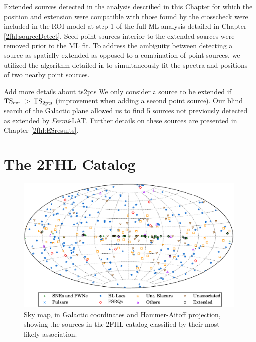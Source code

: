 Extended sources detected in the analysis described in this Chapter for which the position and extension  were compatible with those found by the crosscheck were included in the ROI model at step 1 of the full ML analysis detailed in Chapter \ref{2fhl:sourceDetect}. Seed point sources interior to the extended sources were removed prior to the ML fit. To address the ambiguity between detecting a source as spatially extended as opposed to a combination of point sources, we utilized the algorithm detailed in \cite{Lande12} to simultaneously fit the spectra and positions of two nearby point sources. 

Add more details about ts2pts
We only consider a source to be extended if $\rm TS_{ext}~ >$ $\rm TS_{2pts}$  (improvement when adding a second point source).  Our blind search of the Galactic plane allowed us to find 5 sources not previously detected as extended by {\it Fermi}-LAT.  Further details on these sources are presented in Chapter \ref{2fhl:ESresults}.


%
%

\section{The 2FHL Catalog}
\label{2fhl:results}


\begin{figure}[!ht]
	\centering
	\includegraphics[width=\textwidth]{Figures/all-sky_assoc.eps} 
	\caption{Sky map, in Galactic coordinates and Hammer-Aitoff projection,
		showing the sources in the 2FHL catalog classified by their most likely association. 
		\label{fig:all_sky}}
\end{figure}

